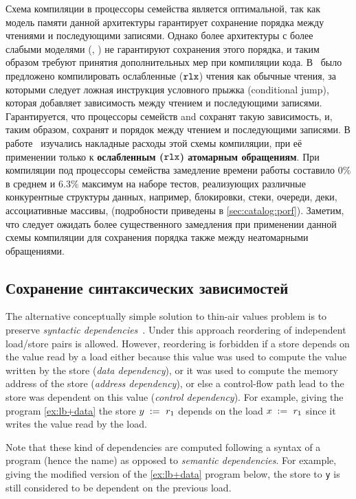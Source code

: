 Схема компиляции в процессоры семейства \Intel
является оптимальной, так как модель памяти данной 
архитектуры гарантирует сохранение порядка 
между чтениями и последующими записями. 
Однако более архитектуры с более слабыми моделями (\ARM, \POWER)
не гарантируют сохранения этого порядка, 
и таким образом требуют принятия дополнительных мер при компиляции кода. 
В~\cite{Boehm-Demsky:MSPC14} было предложено компилировать 
ослабленные ($\mathtt{rlx}$) чтения как обычные чтения, 
за которыми следует ложная инструкция условного прыжка 
(conditional jump), которая добавляет зависимость 
между чтением и последующими записями. 
Гарантируется, что процессоры семейств \ARM and \POWER 
сохранят такую зависимость, и, таким образом, 
сохранят и порядок между чтением и последующими записями. 
В работе~\cite{Ou-Demsky:OOPSLA18} изучались 
накладные расходы этой схемы компиляции, 
при её применении только к \textbf{ослабленным ($\mathtt{rlx}$) атомарным обращениям}.
При компиляции под процессоры семейства  
замедление времени работы составило 0\% в среднем и 6.3\% максимум 
на наборе тестов, реализующих различные конкурентные 
структуры данных, например, блокировки, стеки, очереди, 
деки, ассоциативные массивы, \etc
(подробности приведены в \ref{sec:catalog:porf}).
Заметим, что следует ожидать более существенного замедления
при применении данной схемы компиляции для 
сохранения порядка также между неатомарными обращениями. 

\subsection{Сохранение синтаксических зависимостей}
\label{sec:analysis:deprf}

The alternative conceptually simple solution 
to thin-air values problem is to preserve 
\emph{syntactic dependencies}~\cite{Boehm-Demsky:MSPC14, Alglave-al:ASPLOS18}.
Under this approach reordering of independent load/store pairs is allowed.
However, reordering is forbidden if a store depends on the value 
read by a load either because this value 
was used to compute the value written by the store (\emph{data dependency}), 
or it was used to compute 
the memory address of the store (\emph{address dependency}),
or else a control-flow path lead to the store was dependent
on this value (\emph{control dependency}).
For example, giving the program \ref{ex:lb+data} 
the store $y\;:=_{}\;r_1$ depends 
on the load $x\;:=_{}\;r_1$ since 
it writes the value read by the load.

Note that these kind of dependencies are computed following a 
syntax of a program (hence the name) as opposed 
to \emph{semantic dependencies}.
For example, giving the modified version of 
the \ref{ex:lb+data} program below, 
the store to \texttt{y} is still considered 
to be dependent on the previous load. 


